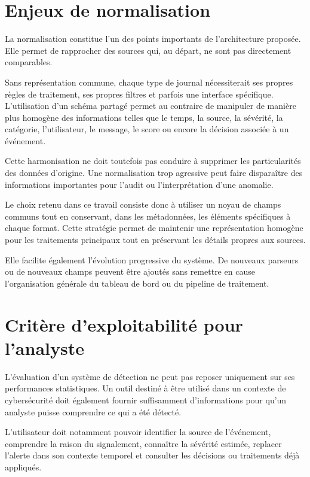 \section{Enjeux de normalisation}

La normalisation constitue l'un des points importants de l'architecture proposée. Elle permet de rapprocher des sources qui, au départ, ne sont pas directement comparables.

Sans représentation commune, chaque type de journal nécessiterait ses propres règles de traitement, ses propres filtres et parfois une interface spécifique. L'utilisation d'un schéma partagé permet au contraire de manipuler de manière plus homogène des informations telles que le temps, la source, la sévérité, la catégorie, l'utilisateur, le message, le score ou encore la décision associée à un événement.

Cette harmonisation ne doit toutefois pas conduire à supprimer les particularités des données d'origine. Une normalisation trop agressive peut faire disparaître des informations importantes pour l'audit ou l'interprétation d'une anomalie.

Le choix retenu dans ce travail consiste donc à utiliser un noyau de champs communs tout en conservant, dans les métadonnées, les éléments spécifiques à chaque format. Cette stratégie permet de maintenir une représentation homogène pour les traitements principaux tout en préservant les détails propres aux sources.

Elle facilite également l'évolution progressive du système. De nouveaux parseurs ou de nouveaux champs peuvent être ajoutés sans remettre en cause l'organisation générale du tableau de bord ou du pipeline de traitement.

\section{Critère d'exploitabilité pour l'analyste}

L'évaluation d'un système de détection ne peut pas reposer uniquement sur ses performances statistiques. Un outil destiné à être utilisé dans un contexte de cybersécurité doit également fournir suffisamment d'informations pour qu'un analyste puisse comprendre ce qui a été détecté.

L'utilisateur doit notamment pouvoir identifier la source de l'événement, comprendre la raison du signalement, connaître la sévérité estimée, replacer l'alerte dans son contexte temporel et consulter les décisions ou traitements déjà appliqués.

